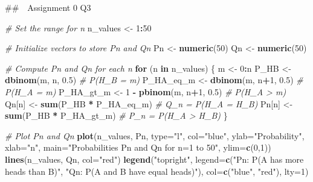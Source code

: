 \documentclass[
]{article}
\newenvironment{Shaded}{\begin{snugshade}}{\end{snugshade}}
\newcommand{\AttributeTok}[1]{\textcolor[rgb]{0.13,0.29,0.53}{#1}}
\newcommand{\CommentTok}[1]{\textcolor[rgb]{0.56,0.35,0.01}{\textit{#1}}}
\newcommand{\ControlFlowTok}[1]{\textcolor[rgb]{0.13,0.29,0.53}{\textbf{#1}}}
\newcommand{\DecValTok}[1]{\textcolor[rgb]{0.00,0.00,0.81}{#1}}
\newcommand{\FloatTok}[1]{\textcolor[rgb]{0.00,0.00,0.81}{#1}}
\newcommand{\FunctionTok}[1]{\textcolor[rgb]{0.13,0.29,0.53}{\textbf{#1}}}
\newcommand{\NormalTok}[1]{#1}
\newcommand{\OtherTok}[1]{\textcolor[rgb]{0.56,0.35,0.01}{#1}}
\newcommand{\SpecialCharTok}[1]{\textcolor[rgb]{0.81,0.36,0.00}{\textbf{#1}}}
\newcommand{\StringTok}[1]{\textcolor[rgb]{0.31,0.60,0.02}{#1}}
\begin{document}
\#\#　Assignment 0 Q3

\begin{Shaded}
\begin{Highlighting}[]
\CommentTok{\# Set the range for n}
\NormalTok{n\_values }\OtherTok{\textless{}{-}} \DecValTok{1}\SpecialCharTok{:}\DecValTok{50}

\CommentTok{\# Initialize vectors to store Pn and Qn}
\NormalTok{Pn }\OtherTok{\textless{}{-}} \FunctionTok{numeric}\NormalTok{(}\DecValTok{50}\NormalTok{)}
\NormalTok{Qn }\OtherTok{\textless{}{-}} \FunctionTok{numeric}\NormalTok{(}\DecValTok{50}\NormalTok{)}

\CommentTok{\# Compute Pn and Qn for each n}
\ControlFlowTok{for}\NormalTok{ (n }\ControlFlowTok{in}\NormalTok{ n\_values) \{}
\NormalTok{  m }\OtherTok{\textless{}{-}} \DecValTok{0}\SpecialCharTok{:}\NormalTok{n}
\NormalTok{  P\_HB }\OtherTok{\textless{}{-}} \FunctionTok{dbinom}\NormalTok{(m, n, }\FloatTok{0.5}\NormalTok{)              }\CommentTok{\# P(H\_B = m)}
\NormalTok{  P\_HA\_eq\_m }\OtherTok{\textless{}{-}} \FunctionTok{dbinom}\NormalTok{(m, n}\SpecialCharTok{+}\DecValTok{1}\NormalTok{, }\FloatTok{0.5}\NormalTok{)       }\CommentTok{\# P(H\_A = m)}
\NormalTok{  P\_HA\_gt\_m }\OtherTok{\textless{}{-}} \DecValTok{1} \SpecialCharTok{{-}} \FunctionTok{pbinom}\NormalTok{(m, n}\SpecialCharTok{+}\DecValTok{1}\NormalTok{, }\FloatTok{0.5}\NormalTok{)   }\CommentTok{\# P(H\_A \textgreater{} m)}
\NormalTok{  Qn[n] }\OtherTok{\textless{}{-}} \FunctionTok{sum}\NormalTok{(P\_HB }\SpecialCharTok{*}\NormalTok{ P\_HA\_eq\_m)         }\CommentTok{\# Q\_n = P(H\_A = H\_B)}
\NormalTok{  Pn[n] }\OtherTok{\textless{}{-}} \FunctionTok{sum}\NormalTok{(P\_HB }\SpecialCharTok{*}\NormalTok{ P\_HA\_gt\_m)         }\CommentTok{\# P\_n = P(H\_A \textgreater{} H\_B)}
\NormalTok{\}}

\CommentTok{\# Plot Pn and Qn}
\FunctionTok{plot}\NormalTok{(n\_values, Pn, }\AttributeTok{type=}\StringTok{"l"}\NormalTok{, }\AttributeTok{col=}\StringTok{"blue"}\NormalTok{, }\AttributeTok{ylab=}\StringTok{"Probability"}\NormalTok{, }\AttributeTok{xlab=}\StringTok{"n"}\NormalTok{, }
     \AttributeTok{main=}\StringTok{"Probabilities Pn and Qn for n=1 to 50"}\NormalTok{, }\AttributeTok{ylim=}\FunctionTok{c}\NormalTok{(}\DecValTok{0}\NormalTok{,}\DecValTok{1}\NormalTok{))}
\FunctionTok{lines}\NormalTok{(n\_values, Qn, }\AttributeTok{col=}\StringTok{"red"}\NormalTok{)}
\FunctionTok{legend}\NormalTok{(}\StringTok{"topright"}\NormalTok{, }\AttributeTok{legend=}\FunctionTok{c}\NormalTok{(}\StringTok{"Pn: P(A has more heads than B)"}\NormalTok{, }
                            \StringTok{"Qn: P(A and B have equal heads)"}\NormalTok{), }
       \AttributeTok{col=}\FunctionTok{c}\NormalTok{(}\StringTok{"blue"}\NormalTok{, }\StringTok{"red"}\NormalTok{), }\AttributeTok{lty=}\DecValTok{1}\NormalTok{)}
\end{Highlighting}
\end{Shaded}
\end{document}
